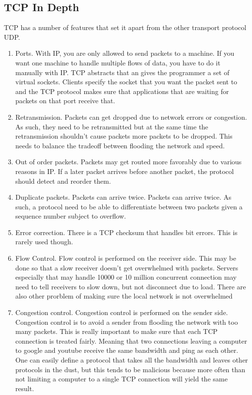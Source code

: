 \begin{aside}
\subsection{TCP In Depth}

TCP has a number of features that set it apart from the other transport protocol UDP. 

\begin{enumerate}
  \item Ports. With IP, you are only allowed to send packets to a machine. If you want one machine to handle multiple flows of data, you have to do it manually with IP. TCP abstracts that an gives the programmer a set of virtual sockets. Clients specify the socket that you want the packet sent to and the TCP protocol makes sure that applications that are waiting for packets on that port receive that.

  \item Retransmission. Packets can get dropped due to network errors or congestion. As such, they need to be retransmitted but at the same time the retransmission shouldn't cause packets more packets to be dropped. This needs to balance the tradeoff between flooding the network and speed.

  \item Out of order packets. Packets may get routed more favorably due to various reasons in IP. If a later packet arrives before another packet, the protocol should detect and reorder them.

  \item Duplicate packets. Packets can arrive twice. Packets can arrive twice. As such, a protocol need to be able to differentiate between two packets given a sequence number subject to overflow.

  \item Error correction. There is a TCP checksum that handles bit errors. This is rarely used though.

  \item Flow Control. Flow control is performed on the receiver side. This may be done so that a slow receiver doesn't get overwhelmed with packets. Servers especially that may handle 10000 or 10 million concurrent connection may need to tell receivers to slow down, but not disconnect due to load. There are also other prorblem of making sure the local network is not overwhelmed

  \item Congestion control. Congestion control is performed on the sender side. Congestion control is to avoid a sender from flooding the network with too many packets. This is really important to make sure that each TCP connection is treated fairly. Meaning that two connections leaving a computer to google and youtube receive the same bandwidth and ping as each other. One can easily define a protocol that takes all the bandwidth and leaves other protocols in the dust, but this tends to be malicious because more often than not limiting a computer to a single TCP connection will yield the same result.


\end{enumerate}
\end{aside}
